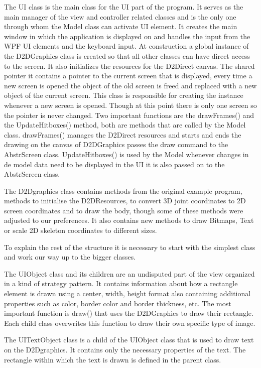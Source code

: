 The UI class is the main class for the UI part of the program. It serves as the main manager of the view and controller related classes and is the only one through whom the Model class can activate UI element. It creates the main window in which the application is displayed on and handles the input from the WPF UI elements and the keyboard input. At construction a global instance of the D2D\textunderscore Graphics class is created so that all other classes can have direct access to the screen. It also initializes the resources for the D2Direct canvas. The shared pointer it contains a pointer to the current screen that is displayed, every time a new screen is opened the object of the old screen is freed and replaced with a new object of the current screen. This class is responsible for creating the instance whenever a new screen is opened. Though at this point there is only one screen so the pointer is never changed. Two important functions are the drawFrames() and the UpdateHitboxes() method, both are methods that are called by the Model class. drawFrames() manages the D2Direct resources and starts and ends the drawing on the canvas of D2D\textunderscore Graphics passes the draw command to the Abstr\textunderscore Screen class. UpdateHitboxes() is used by the Model whenever changes in de model data need to be displayed in the UI it is also passed on to the Abstr\textunderscore Screen class.

The D2D\textunderscore graphics class contains methods from the original example program, methods to initialise the D2DResources, to convert 3D joint coordinates to 2D screen coordinates and to draw the body, though some of these methods were adjusted to our preferences. It also contains new methods to draw Bitmaps, Text or scale 2D skeleton coordinates to different sizes. 

To explain the rest of the structure it is necessary to start with the simplest class and work our way up to the bigger classes.

The UI\textunderscore Object class and its children are an undisputed part of the view organized in a kind of strategy pattern. It contains information about how a rectangle element is drawn using a center, width, height format also containing additional properties such as color, border color and border thickness, etc. The most important function is draw() that uses the D2D\textunderscore Graphics to draw their rectangle. Each child class overwrites this function to draw their own specific type of image.

The UI\textunderscore TextObject class is a child of the UI\textunderscore Object class that is used to draw text on the D2D\textunderscore graphics. It contains only the necessary properties of the text. The rectangle within which the text is drawn is defined in the parent class.

